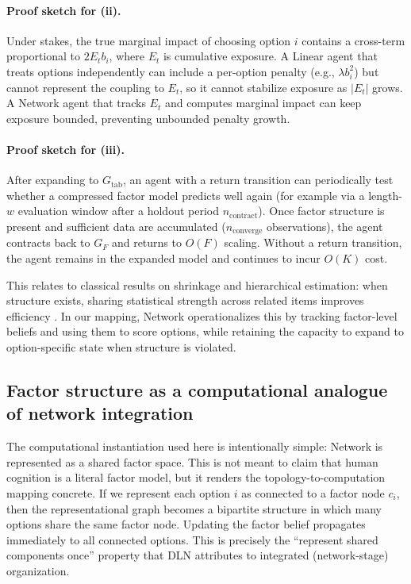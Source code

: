 \documentclass[11pt]{article}
\begin{document}
\paragraph{Proof sketch for (ii).}
Under stakes, the true marginal impact of choosing option $i$ contains a
cross-term proportional to $2E_t b_i$, where $E_t$ is cumulative exposure.  A
Linear agent that treats options independently can include a per-option penalty
(e.g., $\lambda b_i^2$) but cannot represent the coupling to $E_t$, so it cannot
stabilize exposure as $|E_t|$ grows.  A Network agent that tracks $E_t$ and
computes marginal impact can keep exposure bounded, preventing unbounded penalty
growth.

\paragraph{Proof sketch for (iii).}
After expanding to $G_{\mathrm{tab}}$, an agent with a return transition can
periodically test whether a compressed factor model predicts well again (for
example via a length-$w$ evaluation window after a holdout period
$n_{\mathrm{contract}}$).  Once factor structure is present and sufficient data
are accumulated ($n_{\mathrm{converge}}$ observations), the agent contracts back
to $G_F$ and returns to $O(F)$ scaling.  Without a return transition, the agent
remains in the expanded model and continues to incur $O(K)$ cost.


This relates to classical results on shrinkage and hierarchical estimation: when structure exists, sharing statistical strength across related items improves efficiency \cite{JamesStein1961,EfronMorris1977}. In our mapping, Network operationalizes this by tracking factor-level beliefs and using them to score options, while retaining the capacity to expand to option-specific state when structure is violated.

\subsection{Factor structure as a computational analogue of network integration}

The computational instantiation used here is intentionally simple: Network is represented as a shared factor space. This is not meant to claim that human cognition is a literal factor model, but it renders the topology-to-computation mapping concrete. If we represent each option $i$ as connected to a factor node $c_i$, then the representational graph becomes a bipartite structure in which many options share the same factor node. Updating the factor belief propagates immediately to all connected options. This is precisely the ``represent shared components once'' property that DLN attributes to integrated (network-stage) organization.
\end{document}
